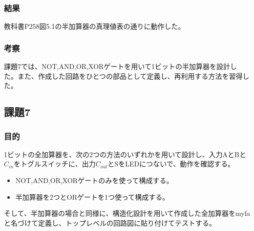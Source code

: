 \documentclass[a4paper]{jarticle}
\begin{document}
\subsubsection{結果}
教科書P258図5.1の半加算器の真理値表の通りに動作した。
\subsubsection{考察}
課題7では、NOT,AND,OR,XORゲートを用いて1ビットの半加算器を設計した。また、作成した回路をひとつの部品として定義し、再利用する方法を習得した。
\subsection{課題7}
\subsubsection{目的}
1ビットの全加算器を、次の2つの方法のいずれかを用いて設計し、入力AとBと$C_{in}$をトグルスイッチに、出力$C_{out}$とSをLEDにつないで、動作を確認する。
\begin{itemize}
	\item NOT,AND,OR,XORゲートのみを使って構成する。
	\item 半加算器を2つとORゲートを1つ使って構成する。
\end{itemize}
そして、半加算器の場合と同様に、構造化設計を用いて作成した全加算器をmyfaと名づけて定義し、トップレベルの回路図に貼り付けてテストする。
\end{document}
